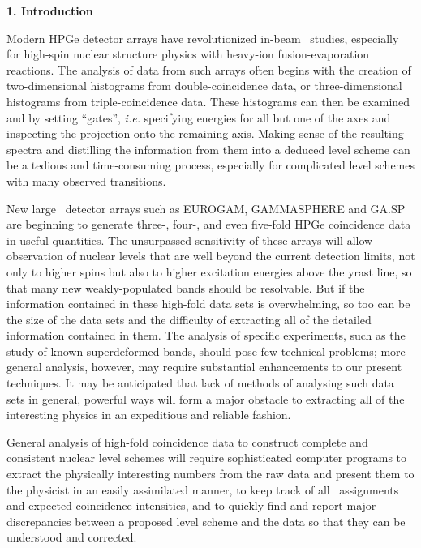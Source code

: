 \newpage
\setlength{\baselineskip}{6mm}
\begin{center}
{\bf                          1. Introduction}
\end{center}

Modern HPGe detector arrays have revolutionized in-beam \ghray\ studies,
especially for high-spin nuclear structure physics with heavy-ion
fusion-evaporation reactions. The analysis of data from such arrays often
begins with the creation of two-dimensional histograms from double-coincidence
data, or three-dimensional histograms from triple-coincidence data. These
histograms can then be examined and by setting ``gates'', {\em i.e.} specifying
energies for all but one of the axes and inspecting the projection onto the
remaining axis. Making sense of the resulting spectra and distilling the
information from them into a deduced level scheme can be a tedious and
time-consuming process, especially for complicated level schemes with many
observed transitions.

New large \ghray\ detector arrays such as EUROGAM, GAMMASPHERE and GA.SP are
beginning to generate three-, four-, and even five-fold HPGe coincidence data
in useful quantities. The unsurpassed sensitivity of these arrays will allow
observation of nuclear levels that are well beyond the current detection
limits, not only to higher spins but also to higher excitation energies above
the yrast line, so that many new weakly-populated bands should be resolvable.
But if the information contained in these high-fold data sets is overwhelming,
so too can be the size of the data sets and the difficulty of extracting all of
the detailed information contained in them. The analysis of specific
experiments, such as the study of known superdeformed bands, should pose few
technical problems; more general analysis, however, may require substantial
enhancements to our present techniques. It may be anticipated that lack of
methods of analysing such data sets in general, powerful ways will form a major
obstacle to extracting all of the interesting physics in an expeditious and
reliable fashion.

General analysis of high-fold coincidence data to construct complete and
consistent nuclear level schemes will require sophisticated computer programs
to extract the physically interesting numbers from the raw data and present
them to the physicist in an easily assimilated manner, to keep track of all
\ghray\  assignments and expected coincidence intensities, and to quickly find
and report major discrepancies between a proposed level scheme and the data so
that they can be understood and corrected.

